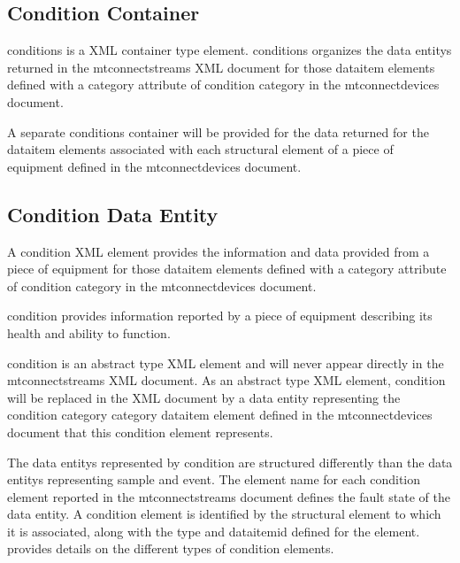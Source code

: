 \subsection{Condition Container}

\gls{conditions} is a XML container type element.  \gls{conditions} organizes the \glspl{data entity} returned in the \gls{mtconnectstreams} XML document for those \gls{dataitem} elements defined with a \gls{category} attribute of \gls{condition category} in the \gls{mtconnectdevices} document.

A separate \gls{conditions} container will be provided for the data returned for the \gls{dataitem} elements associated with each \gls{structural element} of a piece of equipment defined in the \gls{mtconnectdevices} document.



\subsection{Condition Data Entity}\label{sec:Condition Data Entity}

A \gls{condition} XML element provides the information and data provided from a piece of equipment for those \gls{dataitem} elements defined with a \gls{category} attribute of \gls{condition category} in the \gls{mtconnectdevices} document.  

\gls{condition} provides information reported by a piece of equipment describing its health and ability to function.

\gls{condition} is an abstract type XML element and will never appear directly in the \gls{mtconnectstreams} XML document.  As an abstract type XML element, \gls{condition} will be replaced in the XML document by a \gls{data entity} representing the \gls{condition category} category \gls{dataitem} element defined in the \gls{mtconnectdevices} document that this \gls{condition} element represents.

The \glspl{data entity} represented by \gls{condition} are structured differently than the \glspl{data entity} representing \gls{sample} and \gls{event}.   The \gls{element name} for each \gls{condition} element reported in the \gls{mtconnectstreams} document defines the \gls{fault state} of the \gls{data entity}.  A \gls{condition} element is identified by the \gls{structural element} to which it is associated, along with the \gls{type} and \gls{dataitemid} defined for the element.   provides details on the different \glspl{type} of \gls{condition} elements.

